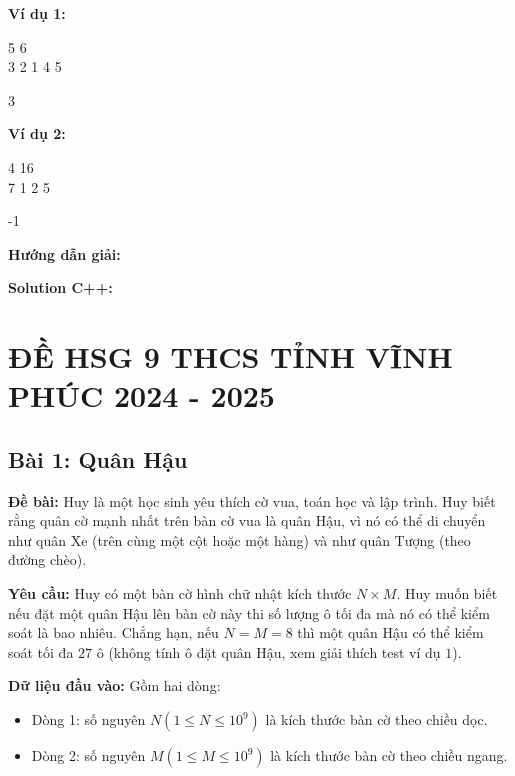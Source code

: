 \documentclass[12pt]{scrartcl}  %
\begin{document}
\textbf{Ví dụ 1:}
\begin{tcolorbox}[colback=gray!5!white, colframe=blue!50!black, title=Input]
5 6\\
3 2 1 4 5
\end{tcolorbox}
\begin{tcolorbox}[colback=gray!5!white, colframe=green!50!black, title=Output]
3
\end{tcolorbox}

\textbf{Ví dụ 2:}
\begin{tcolorbox}[colback=gray!5!white, colframe=blue!50!black, title=Input]
4 16\\
7 1 2 5
\end{tcolorbox}
\begin{tcolorbox}[colback=gray!5!white, colframe=green!50!black, title=Output]
-1
\end{tcolorbox}

\textbf{Hướng dẫn giải:}

\textbf{Solution C++:}

\section{ĐỀ HSG 9 THCS TỈNH VĨNH PHÚC 2024 - 2025}

\subsection{Bài 1: Quân Hậu}
\textbf{Đề bài:}
Huy là một học sinh yêu thích cờ vua, toán học và lập trình. Huy biết rằng quân cờ mạnh nhất trên bàn cờ vua là quân Hậu, vì nó có thể di chuyển như quân Xe (trên cùng một cột hoặc một hàng) và như quân Tượng (theo đường chèo).

\textbf{Yêu cầu:}
Huy có một bàn cờ hình chữ nhật kích thước $N \times M$. Huy muốn biết nếu đặt một quân Hậu lên bàn cờ này thi số lượng ô tối đa mà nó có thể kiểm soát là bao nhiêu. Chẳng hạn, nếu $N = M = 8$ thì một quân Hậu có thể kiểm soát tối đa $27$ ô (không tính ô đặt quân Hậu, xem giải thích test ví dụ $1$).

\textbf{Dữ liệu đầu vào:}
Gồm hai dòng:
\begin{itemize}
    \item Dòng 1: số nguyên $N (1 \leq N \leq 10^9)$ là kích thước bàn cờ theo chiều dọc.
    \item Dòng 2: số nguyên $M (1 \leq M \leq 10^9)$ là kích thước bàn cờ theo chiều ngang.
\end{itemize}
\end{document}

